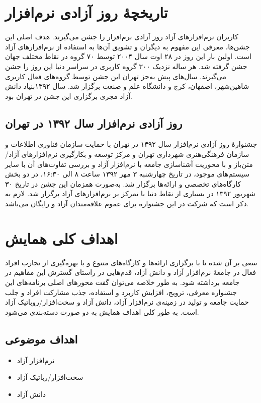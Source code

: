 \documentclass{article}
\begin{document}
\section{تاریخچهٔ روز آزادی نرم‌افزار}
کاربران نرم‌افزارهای آزاد روز آزادی نرم‌افزار را جشن می‌گیرند. هدف اصلی این جشن‌ها، معرفی این مفهوم به دیگران و تشویق آن‌ها به استفاده از نرم‌افزارهای آزاد است.
اولین بار این روز در ۲۸ اوت سال ۲۰۰۴ توسط ۷۰ گروه در نقاط مختلف جهان جشن گرفته شد. هر ساله نزدیک ۳۰۰ گروه کاربری در سراسر دنیا این روز را جشن می‌گیرند. سال‌های پیش به‌جز تهران این جشن توسط گروه‌های فعال کاربری شاهین‌شهر، اصفهان، کرج و دانشگاه علم و صنعت برگزار شد. سال ۱۳۹۲بنیاد دانش آزاد مجری برگزاری این جشن در تهران بود.
\subsection{روز آزادی نرم‌افزار سال ۱۳۹۲ در تهران}
جشنوارهٔ روز آزادی نرم‌افزار سال ۱۳۹۲ در تهران با حمایت سازمان فناوری اطلاعات و سازمان فرهنگی‌هنری شهرداری تهران و مرکز توسعه و بکارگیری نرم‌افزارهای آزاد/متن‌باز و با محوریت آشناسازی جامعه با نرم‌افزار آزاد و بررسی تفاوت‌های آن با سایر سیستم‌های موجود، در تاریخ چهارشنبه ۳ مهر ۱۳۹۲ ساعت ۸ الی ۱۶:۳۰، در دو بخش کارگاه‌های تخصصی و ارائه‌ها برگزار شد. به‌صورت همزمان این جشن در تاریخ ۳۰ شهریور ۱۳۹۲  در بسیاری از نقاط دنیا با تمرکز بر نرم‌افزارهای آزاد برگزار شد. لازم به ذکر است که شرکت در این جشنواره برای عموم علاقه‌مندان آزاد و رایگان می‌باشد.
\section{اهداف کلی همایش}
سعی بر آن شده تا با برگزاری ارائه‌ها و کارگاه‌های متنوع و با بهره‌گیری از تجارب افراد فعال در جامعهٔ نرم‌افزار آزاد و دانش آزاد، قدم‌هایی در راستای گسترش این مفاهیم در جامعه برداشته شود. به طور خلاصه می‌توان گفت محورهای اصلی برنامه‌های این جشنواره معرفی، ترویج، افزایش کاربرد و استفاده، جذب مشارکت افراد و جلب حمایت جامعه و تولید در زمینه‌ی نرم‌افزار آزاد، دانش آزاد و سخت‌افزار/روباتیک آزاد است. به طور کلی اهداف همایش به دو صورت دسته‌بندی می‌شود.

\subsection{اهداف موضوعی}
\begin{flushright}

\begin{itemize}
\item نرم‌افزار آزاد
\item سخت‌افزار/رباتیک آزاد
\item دانش آزاد
\end{itemize}
\end{flushright}
\end{document}
